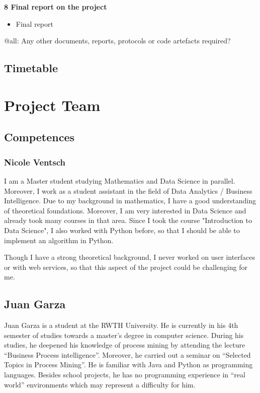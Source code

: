 \documentclass[notitlepage]{article}
\begin{document}
\begin{flushleft}
\textbf{8 Final report on the project}
\\
\begin{itemize}
	\item Final report
\end{itemize}

{\color{red} @all: Any other documents, reports, protocols or code artefacts required?}

\subsection{Timetable}

\section{Project Team}

\subsection{Competences} 
\subsubsection{Nicole Ventsch}

I am a Master student studying Mathematics and Data Science in parallel.  Moreover, I work as a student assistant in the field of Data Analytics / Business Intelligence. Due to my background in mathematics, I have a good understanding of theoretical foundations. Moreover, I am very interested in Data Science and already took many courses in that area. Since I took the course "Introduction to Data Science", I also worked with Python before, so that I should be able to implement an algorithm in Python.

Though I have a strong theoretical background, I never worked on user interfaces or with web services, so that this aspect of the project could be challenging for me. 

\subsection{Juan Garza}

Juan Garza is a student at the RWTH University. He is currently in his 4th semester of studies towards a master’s degree in computer science. During his studies, he deepened his knowledge of process mining by attending the lecture “Business Process intelligence”. Moreover, he carried out a seminar on “Selected Topics in Process Mining”. He is familiar with Java and Python as programming languages. Besides school projects, he has no programming experience in “real world” environments which may represent a difficulty for him. 


\end{flushleft}
\end{document}
